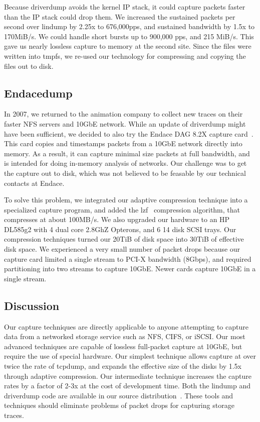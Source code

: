Because driverdump avoids the kernel IP stack, it could
capture packets faster than the IP stack could drop them.
We increased the sustained packets per second over lindump by 2.25x to
676,000pps, and sustained bandwidth by 1.5x to 170MiB/s.  We could
handle short bursts up to 900,000 pps, and 215 MiB/s.  This gave us
nearly lossless capture to memory at the second site.  Since the files
were written into tmpfs, we re-used our technology for compressing and
copying the files out to disk.

\subsection{Endacedump}

In 2007, we returned to the animation company to collect new traces on
their faster NFS servers and 10GbE network.  While an update of
driverdump might have been sufficient, we decided to also try the
Endace DAG 8.2X capture card~\cite{endace-cards}.  This card copies
and timestamps packets from a 10GbE network directly into memory.  As
a result, it can capture minimal size packets at full bandwidth, and
is intended for doing in-memory analysis of networks.  Our challenge
was to get the capture out to disk, which was not believed to be
feasable by our technical contacts at Endace.

To solve this problem, we integrated our adaptive compression
technique into a specialized capture program, and added the
lzf~\cite{lzf} compression algorithm, that compresses at about
100MB/s.  We also upgraded our hardware to an HP DL585g2 with 4 dual
core 2.8GhZ Opterons, and 6 14 disk SCSI trays.  Our compression
techniques turned our 20TiB of disk space into 30TiB of effective disk
space.  We experienced a very small number of packet drops because our
capture card limited a single stream to PCI-X bandwidth (8Gbps), and
required partitioning into two streams to capture 10GbE.  Newer cards
capture 10GbE in a single stream.

\subsection{Discussion}

Our capture techniques are directly applicable to anyone attempting to
capture data from a networked storage service such as NFS, CIFS, or
iSCSI.  Our most advanced techniques are capable of lossless
full-packet capture at 10GbE, but require the use of special hardware.
Our simplest technique allows capture at over twice the rate of
tcpdump, and expands the effective size of the disks by 1.5x through
adaptive compression. Our intermediate technique increases the capture
rates by a factor of 2-3x at the cost of development time.  Both the
lindump and driverdump code are available in our source
distribution~\cite{DSOpenSource}.  These tools and techniques should
eliminate problems of packet drops for capturing storage traces.
